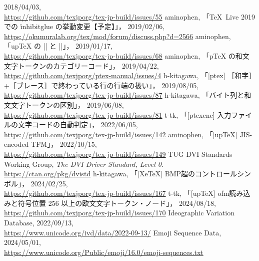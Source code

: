 \documentclass[a4paper,11pt,nomag,dvipdfmx]{jsarticle}
\begin{document}
\begin{thebibliography}{99}
  2018/04/03,\\
  \url{https://github.com/texjporg/tex-jp-build/issues/55}
  aminophen, 「\TeX~Live 2019 での \.{inhibitglue} の挙動変更【予定】」，
  2019/02/06,\\
  \url{https://okumuralab.org/tex/mod/forum/discuss.php?d=2566}
  aminophen, 「upTeX の |\if| と |\ifcat|」，
  2019/01/17,\\
  \url{https://github.com/texjporg/tex-jp-build/issues/68}
  aminophen, 「pTeX の和文文字トークンのカテゴリーコード」，
  2019/04/22,\\
  \url{https://github.com/texjporg/ptex-manual/issues/4}
  h-kitagawa, 「[ptex] ［和字］+［ブレース］で終わっている行の行端の扱い」，
  2019/08/05,\\
  \url{https://github.com/texjporg/tex-jp-build/issues/87}
  h-kitagawa, 「バイト列と和文文字トークンの区別」，
  2019/06/08,\\
  \url{https://github.com/texjporg/tex-jp-build/issues/81}
  t-tk, 「[ptexenc] 入力ファイルの文字コードの自動判定」，
  2022/06/05,\\
  \url{https://github.com/texjporg/tex-jp-build/issues/142}
  aminophen, 「[upTeX] JIS-encoded TFM」，
  2022/10/15,\\
  \url{https://github.com/texjporg/tex-jp-build/issues/149}
  TUG DVI Standards Working Group,
  \textit{The DVI Driver Standard, Level 0}.\\
  \url{https://ctan.org/pkg/dvistd}
  h-kitagawa, 「[XeTeX] BMP超のコントロールシンボル」，
  2024/02/25,\\
  \url{https://github.com/texjporg/tex-jp-build/issues/167}
  t-tk, 「[upTeX] ofm読み込みと符号位置 256 以上の欧文文字トークン・ノード」，
  2024/08/18,\\
  \url{https://github.com/texjporg/tex-jp-build/issues/170}
  Ideographic Variation Database,
  2022/09/13,\\
  \url{https://www.unicode.org/ivd/data/2022-09-13/}
  Emoji Sequence Data,
  2024/05/01,\\
  \url{https://www.unicode.org/Public/emoji/16.0/emoji-sequences.txt}
\end{thebibliography}

\newpage
\printindex
\end{document}
